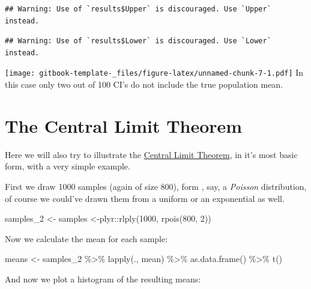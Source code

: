 \documentclass[
]{book}
\newenvironment{Shaded}{\begin{snugshade}}{\end{snugshade}}
\newcommand{\DecValTok}[1]{\textcolor[rgb]{0.00,0.00,0.81}{#1}}
\newcommand{\FunctionTok}[1]{\textcolor[rgb]{0.00,0.00,0.00}{#1}}
\newcommand{\NormalTok}[1]{#1}
\newcommand{\OtherTok}[1]{\textcolor[rgb]{0.56,0.35,0.01}{#1}}
\newcommand{\SpecialCharTok}[1]{\textcolor[rgb]{0.00,0.00,0.00}{#1}}
\begin{document}
\begin{verbatim}
## Warning: Use of `results$Upper` is discouraged. Use `Upper` instead.
\end{verbatim}

\begin{verbatim}
## Warning: Use of `results$Lower` is discouraged. Use `Lower` instead.
\end{verbatim}

\texttt{[image: gitbook-template-\_files/figure-latex/unnamed-chunk-7-1.pdf]}
In this case only two out of 100 CI's do not include the true population mean.

\hypertarget{the-central-limit-theorem}{%
\section{The Central Limit Theorem}\label{the-central-limit-theorem}}

Here we will also try to illustrate the \href{https://en.wikipedia.org/wiki/Central_limit_theorem}{Central Limit Theorem}, in it's most basic form, with a very simple example.

First we draw 1000 samples (again of size 800), form , say, a \emph{Poisson} distribution, of course we could've drawn them from a uniform or an exponential as well.

\begin{Shaded}
\begin{Highlighting}[]
\NormalTok{samples\_2 }\OtherTok{\textless{}{-}}\NormalTok{ samples }\OtherTok{\textless{}{-}}\NormalTok{plyr}\SpecialCharTok{::}\FunctionTok{rlply}\NormalTok{(}\DecValTok{1000}\NormalTok{, }\FunctionTok{rpois}\NormalTok{(}\DecValTok{800}\NormalTok{, }\DecValTok{2}\NormalTok{))}
\end{Highlighting}
\end{Shaded}

Now we calculate the mean for each sample:

\begin{Shaded}
\begin{Highlighting}[]
\NormalTok{means }\OtherTok{\textless{}{-}}\NormalTok{ samples\_2 }\SpecialCharTok{\%\textgreater{}\%}
  \FunctionTok{lapply}\NormalTok{(., mean) }\SpecialCharTok{\%\textgreater{}\%}
  \FunctionTok{as.data.frame}\NormalTok{() }\SpecialCharTok{\%\textgreater{}\%}
  \FunctionTok{t}\NormalTok{()}
\end{Highlighting}
\end{Shaded}

And now we plot a histogram of the resulting means:
\end{document}
